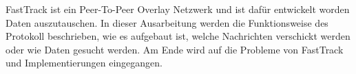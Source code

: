FastTrack ist ein Peer-To-Peer Overlay Netzwerk und ist dafür entwickelt worden Daten auszutauschen. 
In dieser Ausarbeitung werden die Funktionsweise des Protokoll beschrieben, wie es aufgebaut ist, welche Nachrichten verschickt werden oder wie Daten gesucht werden.
Am Ende wird auf die Probleme von FastTrack und Implementierungen eingegangen.